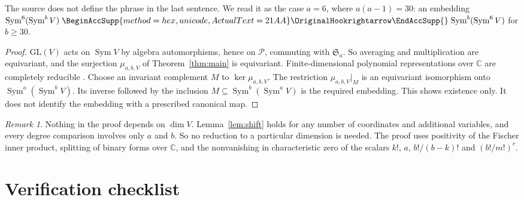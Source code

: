 \documentclass[11pt]{article}
\renewcommand{\hookrightarrow}{\mathrel{
  \BeginAccSupp{method=hex,unicode,ActualText=21AA}
  \OriginalHookrightarrow\EndAccSupp{}}}
\theoremstyle{remark}
\newtheorem{remark}[theorem]{Remark}
\DeclareMathOperator{\Sym}{Sym}
\newcommand{\C}{\mathbb C}
\newcommand{\Sa}{\mathfrak S_a}
\begin{document}
The source does not define the phrase in the last sentence. We read it as
the case $a=6$, where $a(a-1)=30$: an embedding
$\Sym^6(\Sym^bV)\hookrightarrow\Sym^b(\Sym^6V)$ for $b\ge30$.

\begin{proof}
$\mathrm{GL}(V)$ acts on $\Sym V$ by algebra automorphisms, hence on
$\mathcal P$, commuting with $\Sa$. So averaging and multiplication are
equivariant, and the surjection $\mu_{a,b,V}$ of Theorem~\ref{thm:main} is
equivariant. Finite-dimensional polynomial representations over $\C$ are
completely reducible
\cite[Chapter~I, Appendix~A, Sections~7--8]{Macdonald}. Choose an
invariant complement $M$ to $\ker\mu_{a,b,V}$. The restriction
$\mu_{a,b,V}|_M$ is an equivariant isomorphism onto $\Sym^a(\Sym^bV)$. Its
inverse followed by the inclusion $M\subseteq\Sym^b(\Sym^aV)$ is the
required embedding. This shows existence only. It does not identify the
embedding with a prescribed canonical map.
\end{proof}

\begin{remark}
Nothing in the proof depends on $\dim V$. Lemma~\ref{lem:shift} holds for
any number of coordinates and additional variables, and every degree
comparison involves only $a$ and $b$. So no reduction to a particular
dimension is needed. The proof uses positivity of the Fischer inner
product, splitting of binary forms over $\C$, and the nonvanishing in
characteristic zero of the scalars $k!$, $a$, $b!/(b-k)!$ and
$(b!/m!)^r$.
\end{remark}

\section*{Verification checklist}
\end{document}
